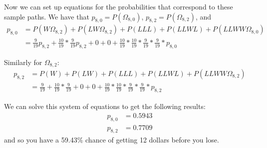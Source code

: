 \documentclass[12pt]{article}
\begin{document}
Now we can set up equations for the probabilities that correspond to these sample paths. We have that $p_{8, 0} = P\left( \Omega_{8, 0}\right)$, $p_{8, 2} = P\left( \Omega_{8, 2}\right)$, and
\begin{align*}
p_{8, 0} &= P\left( W\Omega_{8, 2}\right) + P\left( LW\Omega_{8, 2}\right) + P\left( LLL\right) + P\left( LLWL\right) + P\left(  LLWW\Omega_{8, 0}\right)\\
&= \frac{9}{19}p_{8, 2} + \frac{10}{19}*\frac{9}{19}p_{8, 2} + 0 + 0 + \frac{10}{19}*\frac{10}{19}*\frac{9}{19}*\frac{9}{19}*p_{8, 0}
\end{align*}

Similarly for $\Omega_{8, 2}$:
\begin{align*}
p_{8, 2} &= P\left( W\right) + P\left( LW\right) + P\left( LLL\right) + P\left( LLWL\right) + P\left(  LLWW\Omega_{8, 2}\right)\\
&= \frac{9}{19} + \frac{10}{19}*\frac{9}{19} + 0 + 0 + \frac{10}{19}*\frac{10}{19}*\frac{9}{19}*\frac{9}{19}*p_{8, 2}
\end{align*}

We can solve this system of equations to get the following results:
\begin{align*}
p_{8, 0} &= 0.5943\\
p_{8, 2} &= 0.7709
\end{align*}
and so you have a 59.43$\%$ chance of getting 12 dollars before you lose.\\



\end{document}

